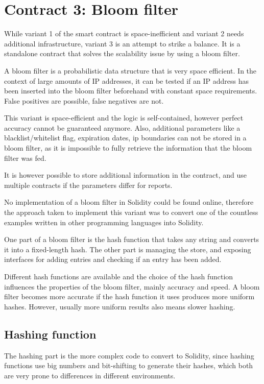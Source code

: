 \section{Contract 3: Bloom filter}

While variant 1 of the smart contract is space-inefficient and variant 2 needs additional infrastructure, variant 3 is an attempt to strike a balance. It is a standalone contract that solves the scalability issue by using a bloom filter.

A bloom filter is a probabilistic data structure that is very space efficient. In the context of large amounts of IP addresses, it can be tested if an IP address has been inserted into the bloom filter beforehand with constant space requirements. False positives are possible, false negatives are not.

This variant is space-efficient and the logic is self-contained, however perfect accuracy cannot be guaranteed anymore. Also, additional parameters like a blacklist/whitelist flag, expiration dates, ip boundaries can not be stored in a bloom filter, as it is impossible to fully retrieve the information that the bloom filter was fed.

It is however possible to store additional information in the contract, and use multiple contracts if the parameters differ for reports.

No implementation of a bloom filter in Solidity could be found online, therefore the approach taken to implement this variant was to convert one of the countless examples written in other programming languages into Solidity.

One part of a bloom filter is the hash function that takes any string and converts it into a fixed-length hash. The other part is managing the store, and exposing interfaces for adding entries and checking if an entry has been added.

Different hash functions are available and the choice of the hash function influences the properties of the bloom filter, mainly accuracy and speed. A bloom filter becomes more accurate if the hash function it uses produces more uniform hashes. However, usually more uniform results also means slower hashing.

\subsection{Hashing function}

The hashing part is the more complex code to convert to Solidity, since hashing functions use big numbers and bit-shifting to generate their hashes, which both are very prone to differences in different environments.

